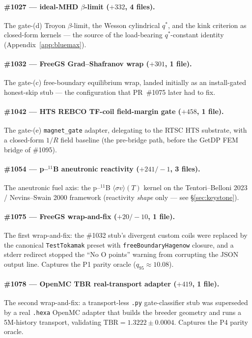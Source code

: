 \paragraph{\#1027 --- ideal-MHD $\beta$-limit ($+332$, 4 files).}
The gate-(d) Troyon $\beta$-limit, the Wesson cylindrical $q^{*}$, and
the kink criterion as closed-form kernels --- the source of the
load-bearing $q^{*}$-constant identity (Appendix~\ref{app:bluemax}).

\paragraph{\#1032 --- FreeGS Grad--Shafranov wrap ($+301$, 1 file).}
The gate-(c) free-boundary equilibrium wrap, landed initially as an
install-gated honest-skip stub --- the configuration that PR~\#1075
later had to fix.

\paragraph{\#1042 --- HTS REBCO TF-coil field-margin gate
($+458$, 1 file).}
The gate-(e) \texttt{magnet\_gate} adapter, delegating to the RTSC HTS
substrate, with a closed-form $1/R$ field baseline (the pre-bridge
path, before the GetDP FEM bridge of \#1095).

\paragraph{\#1054 --- p--$^{11}$B aneutronic reactivity
($+241/-1$, 3 files).}
The aneutronic fuel axis: the p--$^{11}$B $\langle\sigma v\rangle(T)$
kernel on the Tentori--Belloni 2023 / Nevins--Swain 2000 framework
(reactivity \emph{shape} only --- see \S\ref{sec:keystone}).

\paragraph{\#1075 --- FreeGS wrap-and-fix ($+20/-10$, 1 file).}
The first wrap-and-fix: the \#1032 stub's divergent custom coils were
replaced by the canonical \texttt{TestTokamak} preset with
\texttt{freeBoundaryHagenow} closure, and a stderr redirect stopped the
``No O points'' warning from corrupting the JSON output line. Captures
the P1 parity oracle ($q_{95}\approx10.08$).

\paragraph{\#1078 --- OpenMC TBR real-transport adapter
($+419$, 1 file).}
The second wrap-and-fix: a transport-less \texttt{.py} gate-classifier
stub was superseded by a real \texttt{.hexa} OpenMC adapter that builds
the breeder geometry and runs a 5M-history transport, validating
$\text{TBR}=1.3222\pm0.0004$. Captures the P4 parity oracle.


